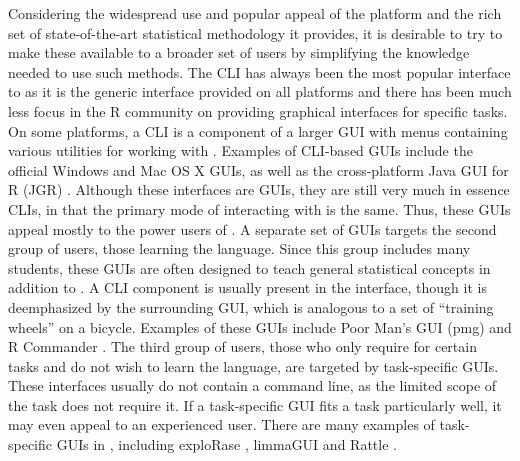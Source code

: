 \documentclass[article]{jss}
\begin{document}
Considering the widespread use and popular appeal of the 
platform and the rich set of state-of-the-art statistical methodology
it provides, it is desirable to try to make these available to a
broader set of users by simplifying the knowledge needed to use such
methods.
The CLI has always been the most popular interface to  as
it is the generic interface provided on all platforms and there has
been much less focus in the R community on providing graphical
interfaces for specific tasks.  On some platforms, a CLI is a
component of a larger GUI with menus containing various utilities for
working with . Examples of CLI-based  GUIs
include the official Windows and Mac OS X GUIs, as well as the
cross-platform Java GUI for R (JGR) \citep{JGR}. Although these
interfaces are GUIs, they are still very much in essence CLIs, in that
the primary mode of interacting with  is the same. Thus,
these GUIs appeal mostly to the power users of .  A
separate set of GUIs targets the second group of users, those learning
the  language. Since this group includes many students,
these GUIs are often designed to teach general statistical concepts in
addition to .  A CLI component is usually present in the
interface, though it is deemphasized by the surrounding GUI, which is
analogous to a set of ``training wheels'' on a bicycle. Examples of
these GUIs include Poor Man's GUI (pmg) \citep{pmg} and R Commander
\citep{rcmndr}. The third group of users, those who only require
 for certain tasks and do not wish to learn the language,
are targeted by task-specific GUIs. These interfaces usually do not
contain a command line, as the limited scope of the task does not
require it. If a task-specific GUI fits a task particularly well, it
may even appeal to an experienced user. There are many examples of
task-specific GUIs in , including exploRase
\citep{explorase}, limmaGUI \citep{limma} and Rattle \citep{rattle}.
\end{document}
